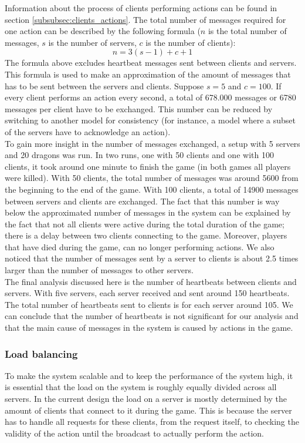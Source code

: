 		Information about the process of clients performing actions can be found in section \ref{subsubsec:clients_actions}. 
		The total number of messages required for one action can be described by the following formula ($ n $ is the total number of messages, $ s $ is the number of servers, $ c $ is the number of clients):
		$$ n = 3(s - 1) + c + 1 $$
		The formula above excludes heartbeat messages sent between clients and servers.
		This formula is used to make an approximation of the amount of messages that has to be sent between the servers and clients. 
		Suppose $ s = 5 $ and $ c = 100 $. 
		If every client performs an action every second, a total of 678.000 messages or 6780 messages per client have to be exchanged. 
		This number can be reduced by switching to another model for consistency (for instance, a model where a subset of the servers have to acknowledge an action).\\
		To gain more insight in the number of messages exchanged, a setup with 5 servers and 20 dragons was run. 
		In two runs, one with 50 clients and one with 100 clients, it took around one minute to finish the game (in both games all players were killed). 
		With 50 clients, the total number of messages was around 5600 from the beginning to the end of the game. 
		With 100 clients, a total of 14900 messages between servers and clients are exchanged. 
		The fact that this number is way below the approximated number of messages in the system can be explained by the fact that not all clients were active during the total duration of the game; there is a delay between two clients connecting to the game. 
		Moreover, players that have died during the game, can no longer performing actions. We also noticed that the number of messages sent by a server to clients is about 2.5 times larger than the number of messages to other servers.\\
		The final analysis discussed here is the number of heartbeats between clients and servers. 
		With five servers, each server received and sent around 150 heartbeats. 
		The total number of heartbeats sent to clients is for each server around 105. 
		We can conclude that the number of heartbeats is not significant for our analysis and that the main cause of messages in the system is caused by actions in the game.

\subsubsection{Load balancing}
\label{subsubsec:exp_load}
To make the system scalable and to keep the performance of the system high, it is essential that the load on the system is roughly equally divided across all servers.
In the current design the load on a server is mostly determined by the amount of clients that connect to it during the game. 
This is because the server has to handle all requests for these clients, from the request itself, to checking the validity of the action until the broadcast to actually perform the action.


